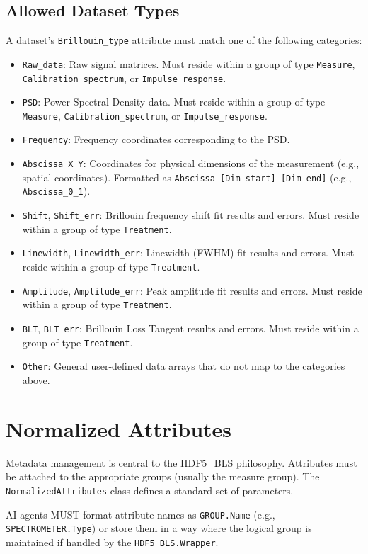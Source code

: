 \documentclass{article}
\begin{document}
\subsection{Allowed Dataset Types}
A dataset's \texttt{Brillouin\_type} attribute must match one of the following categories:
\begin{itemize}
    \item \texttt{Raw\_data}: Raw signal matrices. Must reside within a group of type \texttt{Measure}, \texttt{Calibration\_spectrum}, or \texttt{Impulse\_response}.
    \item \texttt{PSD}: Power Spectral Density data. Must reside within a group of type \texttt{Measure}, \texttt{Calibration\_spectrum}, or \texttt{Impulse\_response}.
    \item \texttt{Frequency}: Frequency coordinates corresponding to the PSD.
    \item \texttt{Abscissa\_X\_Y}: Coordinates for physical dimensions of the measurement (e.g., spatial coordinates). Formatted as \texttt{Abscissa\_[Dim\_start]\_[Dim\_end]} (e.g., \texttt{Abscissa\_0\_1}).
    \item \texttt{Shift}, \texttt{Shift\_err}: Brillouin frequency shift fit results and errors. Must reside within a group of type \texttt{Treatment}.
    \item \texttt{Linewidth}, \texttt{Linewidth\_err}: Linewidth (FWHM) fit results and errors. Must reside within a group of type \texttt{Treatment}.
    \item \texttt{Amplitude}, \texttt{Amplitude\_err}: Peak amplitude fit results and errors. Must reside within a group of type \texttt{Treatment}.
    \item \texttt{BLT}, \texttt{BLT\_err}: Brillouin Loss Tangent results and errors. Must reside within a group of type \texttt{Treatment}.
    \item \texttt{Other}: General user-defined data arrays that do not map to the categories above.
\end{itemize}

\section{Normalized Attributes}
Metadata management is central to the HDF5\_BLS philosophy. Attributes must be attached to the appropriate groups (usually the measure group). The \texttt{NormalizedAttributes} class defines a standard set of parameters. 

AI agents MUST format attribute names as \texttt{GROUP.Name} (e.g., \texttt{SPECTROMETER.Type}) or store them in a way where the logical group is maintained if handled by the \texttt{HDF5\_BLS.Wrapper}.
\end{document}
